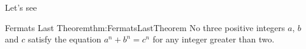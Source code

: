 \documentclass[11pt, letterpaper]{exercise}
\begin{document}

    \begin{problem}{}{}
    Let's see
    \end{problem}

    \begin{myTheorem}{Fermats Last Theorem}{thm:FermatsLastTheorem}
        No three positive integers \(a\), \(b\) and \(c\) satisfy the equation
        \(a^{n} + b^{n} = c^{n}\) for any integer greater than two.
    \end{myTheorem}
\end{document}
